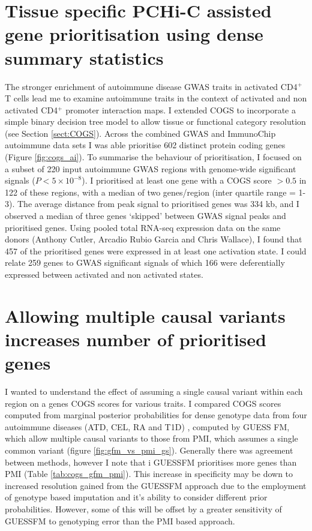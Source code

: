 \documentclass[a4paper,11pt]{report}
\begin{document}
\section{Tissue specific PCHi-C assisted gene prioritisation using dense summary statistics}
The stronger enrichment of autoimmune disease GWAS traits in activated CD4$^+$ T cells lead me to examine autoimmune traits in the context of activated and non activated CD4$^{+}$ promoter interaction maps. I extended COGS to  incorporate a simple binary decision tree model to allow tissue or functional category resolution (see Section \ref{sect:COGS}).  Across the combined GWAS and ImmunoChip autoimmune data sets I was able prioritise 602 distinct protein coding genes  (Figure \ref{fig:cogs_ai}). To summarise the behaviour of prioritisation, I focused on a subset of 220 input autoimmune GWAS regions with genome-wide significant signals ($P<5 \times 10^{-8}$). I prioritised at least one gene with a COGS score $>0.5$ in 122 of these regions, with a median of two genes/region (inter quartile range = 1-3). The average distance from peak signal to prioritised genes was 334 kb, and I observed a median of three genes `skipped' between GWAS signal peaks and prioritised genes. Using pooled total RNA-seq expression data on the same donors (Anthony Cutler, Arcadio Rubio Garcia and Chris Wallace), I found that 457 of the prioritised genes were expressed in at least one activation state. I could relate 259 genes to GWAS significant signals of which 166 were deferentially expressed between activated and non activated states.

\section{Allowing multiple causal variants increases number of prioritised genes}
I wanted to understand the effect of assuming a single causal variant within each region on a genes COGS scores for various traits. I compared COGS scores computed from marginal posterior probabilities for dense genotype data from four autoimmune diseases (ATD, CEL, RA and T1D) , computed by GUESS FM, which allow multiple causal variants to those from PMI, which assumes a single common variant (figure \ref{fig:gfm_vs_pmi_gs}). Generally there was agreement between methods, however I note that i GUESSFM prioritises more genes than PMI (Table \ref{tab:cogs_gfm_pmi}). This increase in specificity may be down to increased resolution gained from the GUESSFM approach due to the employment of genotype based imputation and it's ability to consider different prior probabilities. However, some of this will be offset by a greater sensitivity of GUESSFM to genotyping error than the PMI based approach.
\end{document}
